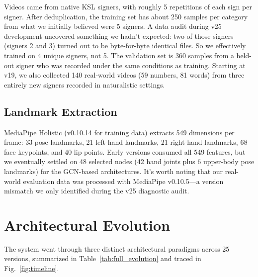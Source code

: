 \documentclass[conference]{IEEEtran}
\begin{document}
Videos came from native KSL signers, with roughly 5 repetitions of each sign per signer. After deduplication, the training set has about 250 samples per category from what we initially believed were 5 signers. A data audit during v25 development uncovered something we hadn't expected: two of those signers (signers 2 and 3) turned out to be byte-for-byte identical files. So we effectively trained on 4 unique signers, not 5. The validation set is 360 samples from a held-out signer who was recorded under the same conditions as training. Starting at v19, we also collected 140 real-world videos (59 numbers, 81 words) from three entirely new signers recorded in naturalistic settings.

\subsection{Landmark Extraction}

MediaPipe Holistic (v0.10.14 for training data) extracts 549 dimensions per frame: 33 pose landmarks, 21 left-hand landmarks, 21 right-hand landmarks, 68 face keypoints, and 40 lip points. Early versions consumed all 549 features, but we eventually settled on 48 selected nodes (42 hand joints plus 6 upper-body pose landmarks) for the GCN-based architectures. It's worth noting that our real-world evaluation data was processed with MediaPipe v0.10.5---a version mismatch we only identified during the v25 diagnostic audit.

\section{Architectural Evolution}

The system went through three distinct architectural paradigms across 25 versions, summarized in Table~\ref{tab:full_evolution} and traced in Fig.~\ref{fig:timeline}.
\end{document}
